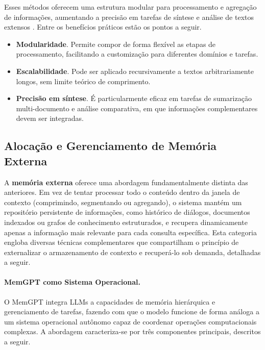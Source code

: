 Esses métodos oferecem uma estrutura modular para processamento e agregação de informações, aumentando a precisão em tarefas de síntese e análise de textos extensos \cite{kamradt2023workaround}. Entre os benefícios práticos estão os pontos a seguir.

\begin{itemize}[leftmargin=1.6em]
\item \textbf{Modularidade}. Permite compor de forma flexível as etapas de processamento, facilitando a customização para diferentes domínios e tarefas.

\item \textbf{Escalabilidade}. Pode ser aplicado recursivamente a textos arbitrariamente longos, sem limite teórico de comprimento.

\item \textbf{Precisão em síntese}. É particularmente eficaz em tarefas de sumarização multi-documento e análise comparativa, em que informações complementares devem ser integradas.
\end{itemize}

\subsection{Alocação e Gerenciamento de Memória Externa}
\label{subsec:memoria-externa}

A \textbf{memória externa} oferece uma abordagem fundamentalmente distinta das anteriores. Em vez de tentar processar todo o conteúdo dentro da janela de contexto (comprimindo, segmentando ou agregando), o sistema mantém um repositório persistente de informações, como histórico de diálogos, documentos indexados ou grafos de conhecimento estruturados, e recupera dinamicamente apenas a informação mais relevante para cada consulta específica. Esta categoria engloba diversas técnicas complementares que compartilham o princípio de externalizar o armazenamento de contexto e recuperá-lo sob demanda, detalhadas a seguir.

\paragraph{MemGPT como Sistema Operacional.}
O MemGPT \cite{packer2024memgpt} integra LLMs a capacidades de memória hierárquica e gerenciamento de tarefas, fazendo com que o modelo funcione de forma análoga a um sistema operacional autônomo capaz de coordenar operações computacionais complexas. A abordagem caracteriza-se por três componentes principais, descritos a seguir.


